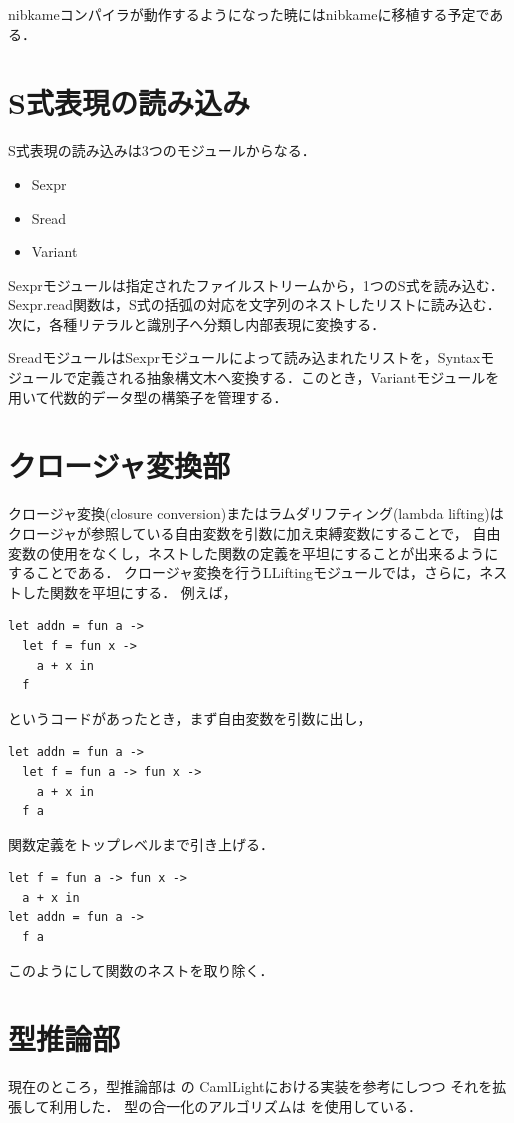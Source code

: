 \documentclass[a4paper,titlepage,disablejfam]{jsbook}
\begin{document}
nibkameコンパイラが動作するようになった暁にはnibkameに移植する予定である．


\section{S式表現の読み込み}\label{sc:impl-s-reader}
S式表現の読み込みは3つのモジュールからなる．
\begin{itemize}
 \item Sexpr
 \item Sread
 \item Variant
\end{itemize}

Sexprモジュールは指定されたファイルストリームから，1つのS式を読み込む．
Sexpr.read関数は，S式の括弧の対応を文字列のネストしたリストに読み込む．
次に，各種リテラルと識別子へ分類し内部表現に変換する．

SreadモジュールはSexprモジュールによって読み込まれたリストを，Syntaxモ
ジュールで定義される抽象構文木へ変換する．このとき，Variantモジュールを
用いて代数的データ型の構築子を管理する．


\section{クロージャ変換部}\label{sc:impl-lambda-lifting}
クロージャ変換(closure conversion)またはラムダリフティング(lambda lifting)は
クロージャが参照している自由変数を引数に加え束縛変数にすることで，
自由変数の使用をなくし，ネストした関数の定義を平坦にすることが出来るようにすることである．
クロージャ変換を行うLLiftingモジュールでは，さらに，ネストした関数を平坦にする．
例えば，
\begin{lstlisting}
let addn = fun a ->
  let f = fun x ->
    a + x in
  f
\end{lstlisting}
というコードがあったとき，まず自由変数を引数に出し，
\begin{lstlisting}
let addn = fun a ->
  let f = fun a -> fun x ->
    a + x in
  f a
\end{lstlisting}
関数定義をトップレベルまで引き上げる．
\begin{lstlisting}
let f = fun a -> fun x ->
  a + x in
let addn = fun a ->
  f a
\end{lstlisting}
このようにして関数のネストを取り除く．


\section{型推論部}\label{sc:impl-type-inference}
現在のところ，型推論部は
\algorithmW\cite{Milner1978348,Damas:1982:PTF:582153.582176}の
CamlLightにおける実装\cite{Lee:1998:PFL:291891.291892}を参考にしつつ
それを拡張して利用した．
型の合一化のアルゴリズムは
\algorithmU\cite{DBLP:books/el/RV01/BaaderS01}
を使用している．
\end{document}
